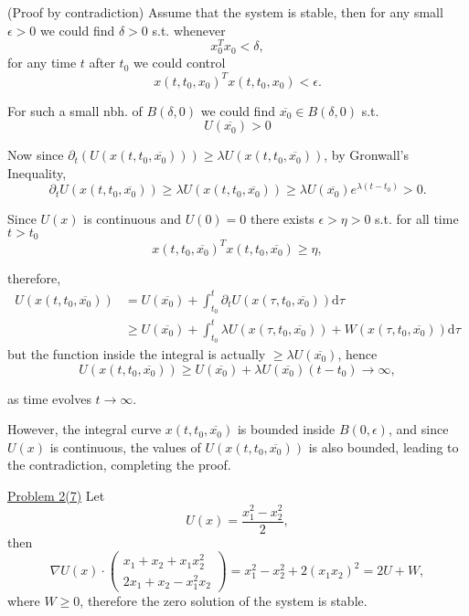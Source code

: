 \documentclass{tufte-handout}
\begin{document}
\begin{formalproof} 
	(Proof by contradiction)
	Assume that the system is stable, then for any small $\epsilon>0$ we could find $\delta>0$ s.t. whenever \[ x_0^T x_0 < \delta, \]
	for any time $t$ after $t_0$ we could control \[ x(t,t_0,x_0)^Tx(t,t_0,x_0)< \epsilon.  \]

For such a small nbh. of $B(\delta,0)$ we could find $\overline{x_0} \in B(\delta,0)$ s.t. \[ U(\overline{x_0})> 0 \]

Now since $\partial_t (U(x(t,t_0,\overline{x_0}))) \geq \lambda U(x(t,t_0,\overline{x_0}))$, by Gronwall's Inequality, \[ \partial_t U(x(t,t_0,\overline{x_0})) \geq \lambda U(x(t,t_0,\overline{x_0})) \geq \lambda U(\overline{x_0}) e^{\lambda(t-t_0)}> 0. \]

Since $U(x)$ is continuous and $U(0)=0$ there exists $\epsilon >\eta> 0$ s.t. for all time $t>t_0$ \[ x(t,t_0,\overline{x_0})^T x(t,t_0,\overline{x_0}) \geq \eta, \]

therefore, 
\begin{align*}
  U(x(t,t_0,\overline{x_0})) &= U(\overline{x_0})+ \int_{t_0}^t \partial_t U(x(\tau,t_0,\overline{x_0})) \text{d}\tau \\
                             &\geq U(\overline{x_0})+ \int_{t_0}^t \lambda U(x(\tau,t_0,\overline{x_0})) + W(x(\tau,t_0,\overline{x_0})) \text{d}\tau
\end{align*}
but the function inside the integral is actually $\geq \lambda U(\overline{x_0})$, hence \[ U(x(t,t_0,\overline{x_0})) \geq U(\overline{x_0}) + \lambda U(\overline{x_0})(t-t_0) \to \infty, \]

as time evolves $t\to\infty$. 

However, the integral curve $x(t,t_0,\overline{x_0})$ is bounded inside $B(0,\epsilon)$, and since $U(x)$ is continuous, the values of $U(x(t,t_0,\overline{x_0}))$ is also bounded, leading to the contradiction, completing the proof.
\end{formalproof}

\underline{Problem 2(7)} Let \[ U(x)=\frac{x_1^2-x_2^2}{2}, \]
then \[ \nabla U(x) \cdot 
	\begin{pmatrix}
		x_1+x_2+x_1x_2^2 \\
		2x_1+x_2-x_1^2 x_2
	\end{pmatrix}
	= x_1^2-x_2^2+2(x_1x_2)^2=2U+W,
\]
where $W\geq 0$, therefore the zero solution of the system is stable.
\end{document}
